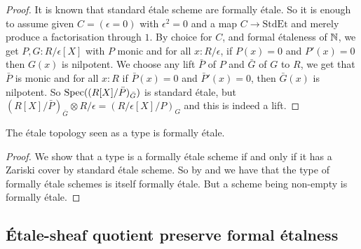 \begin{proof}
It is known that standard \'etale scheme are formally \'etale. So it is enough to assume given $C=(\epsilon=0)$ with $\epsilon^2=0$ and a map $C\to\mathrm{StdEt}$ and merely produce a factorisation through $1$. By choice for $C$, and formal étaleness of $\mathbb{N}$, we get $P,G:R/\epsilon[X]$ with $P$ monic and for all $x:R/\epsilon$, if $P(x)= 0$ and $P'(x)=0$ then $G(x)$ is nilpotent. We choose any lift $\bar{P}$ of $P$ and $\bar{G}$ of $G$ to $R$, we get that $\bar{P}$ is monic and for all $x:R$ if $\bar{P}(x)=0$ and $\bar{P}'(x)=0$, then $\bar{G}(x)$ is nilpotent. So $\operatorname{Spec}((R[X]/\bar{P})_{\bar{G}})$ is standard \'etale, but $(R[X]/\bar{P})_{\bar{G}}\otimes R/\epsilon = (R/\epsilon[X]/P)_{G}$ and this is indeed a lift. 
\end{proof}

\begin{proposition}\label{etale-topology-is-formally-etale}
The \'etale topology seen as a type is formally \'etale.
\end{proposition}

\begin{proof}
We show that a type is a formally \'etale scheme if and only if it has a Zariski cover by standard \'etale scheme. So by  and  we have that the type of formally \'etale schemes is itself formally \'etale. But a scheme being non-empty is formally \'etale.

\end{proof}



\subsection{\'Etale-sheaf quotient preserve formal \'etalness}



